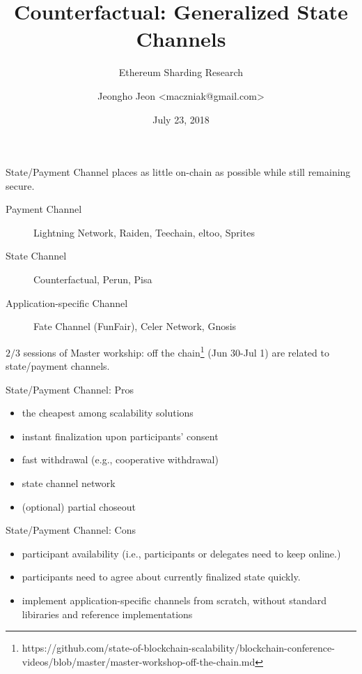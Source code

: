 \documentclass{beamer}
\title{Counterfactual: Generalized State Channels}
\subtitle{Ethereum Sharding Research}
\date{July 23, 2018}
\author{Jeongho Jeon <maczniak@gmail.com>}
\institute{\textbf{Whitepaper} Foundation, Nonce\\%
(for internal discussion purposes only)}
\begin{document}
\maketitle

\begin{frame}{State/Payment Channel}
places as little on-chain as possible while still remaining secure.
\begin{description}
\item[Payment Channel] Lightning Network, Raiden, Teechain, eltoo, Sprites
\item[State Channel] Counterfactual, Perun, Pisa
\item[Application-specific Channel] Fate Channel (FunFair), Celer Network, Gnosis
\end{description}

$2/3$ sessions of Master workship: off the
 chain\footnote{https://github.com/state-of-blockchain-scalability/blockchain-conference-videos/blob/master/master-workshop-off-the-chain.md}
 (Jun 30-Jul 1) are related to state/payment channels.
\end{frame}

\begin{frame}{State/Payment Channel: Pros}
\begin{itemize}
\item the cheapest among scalability solutions
\item instant finalization upon participants' consent
\item fast withdrawal (e.g., cooperative withdrawal)
\item state channel network
\item (optional) partial choseout
\end{itemize}
\end{frame}

\begin{frame}{State/Payment Channel: Cons}
\begin{itemize}
\item participant availability (i.e., participants or delegates need to keep online.)
\item participants need to agree about currently finalized state quickly.
\item implement application-specific channels from scratch, without standard libiraries and reference implementations
\end{itemize}
\end{frame}
\end{document}
